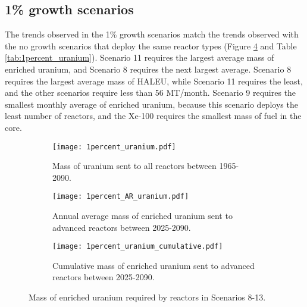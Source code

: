 \subsection{1\% growth scenarios}
The trends observed in the 1\% growth scenarios match the trends 
observed with the no growth scenarios that deploy the same reactor 
types
(Figure \ref{fig:1percent_uranium} and Table \ref{tab:1percent_uranium}). 
Scenario 11 requires the largest average mass of enriched uranium, and Scenario
8 requires the next largest average. Scenario 8 requires the largest 
average mass of \gls{HALEU}, while Scenario 11 requires the least, and the 
other scenarios require less than 56 MT/month. Scenario 9 requires the 
smallest monthly average of enriched uranium, because this scenario 
deploys the least number of reactors, and the Xe-100 requires the smallest 
mass of fuel in the core. 

\begin{figure}
    \centering
    \begin{subfigure}[b]{0.45\textwidth}
        \centering
        \texttt{[image: 1percent\_uranium.pdf]}
        \caption{Mass of uranium sent to all reactors between 1965-2090.}
        \label{fig:1percent_all_uranium}
    \end{subfigure}
    \hfill
    \begin{subfigure}[b]{0.45\textwidth}
        \centering
        \texttt{[image: 1percent\_AR\_uranium.pdf]}
        \caption{Annual average mass of enriched uranium sent to 
        advanced reactors between 2025-2090.}
        \label{fig:1percent_AR_uranium}
    \end{subfigure}
    \begin{subfigure}[b]{0.45\textwidth}
        \centering
        \texttt{[image: 1percent\_uranium\_cumulative.pdf]}
        \caption{Cumulative mass of enriched uranium sent to advanced reactors 
        between 2025-2090.}
        \label{fig:1percent_uranium_cumulative}
    \end{subfigure}
       \caption{Mass of enriched uranium required by reactors
        in Scenarios 8-13.}
       \label{fig:1percent_uranium}
\end{figure}

